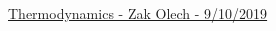 \documentclass[10pt,landscape]{article}
\begin{document}
\raggedright
\footnotesize

\begin{center}
     \Large{\underline{Thermodynamics - Zak Olech - 9/10/2019}}
\end{center}
\begin{multicols}{3}

\setlength{\columnseprule}{0.25pt}
\setlength{\premulticols}{1pt}
\setlength{\postmulticols}{1pt}
\setlength{\multicolsep}{1pt}
\setlength{\columnsep}{2pt}

\end{multicols}
\end{document}
